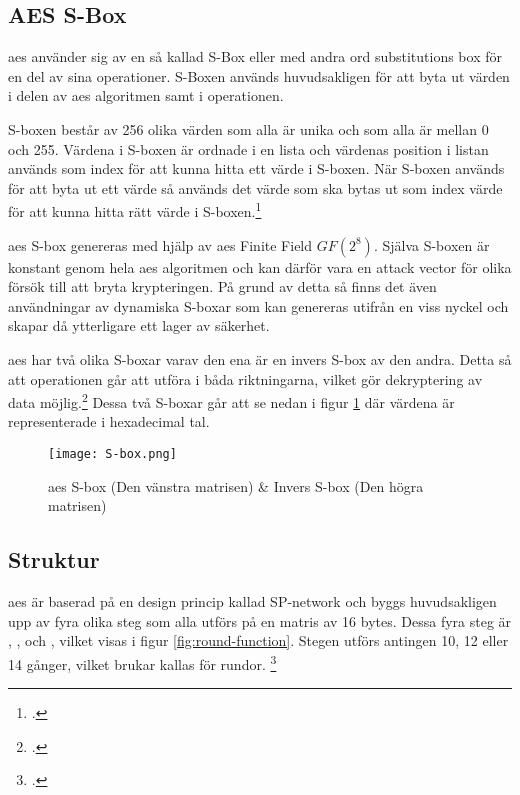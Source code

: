 \subsection{AES S-Box}
\label{sec:aes-sbox}
\acrshort{aes} använder sig av en så kallad S-Box eller med andra ord substitutions box
för en del av sina operationer. S-Boxen används huvudsakligen för att byta ut värden
i  delen av \acrshort{aes} algoritmen samt i
 operationen.

S-boxen består av 256 olika värden som alla är unika och som alla är mellan 0 och 255.
Värdena i S-boxen är ordnade i en lista och värdenas position i listan används som
index för att kunna hitta ett värde i S-boxen. När S-boxen används för att byta ut
ett värde så används det värde som ska bytas ut som index värde för att kunna hitta
rätt värde i S-boxen.\footcite{sbox_wiki}

\acrshort{aes} S-box genereras med hjälp av \acrshort{aes} Finite Field {$GF(2^8)$}.
Själva S-boxen är konstant genom hela \acrshort{aes} algoritmen och kan därför
vara en attack vector för olika försök till att bryta krypteringen. På grund av
detta så finns det även användningar av dynamiska S-boxar som kan genereras
utifrån en viss nyckel och skapar då ytterligare ett lager av säkerhet.

\acrshort{aes} har två olika S-boxar varav den ena är en invers S-box av den andra.
Detta så att operationen går att utföra i båda riktningarna, vilket gör dekryptering
av data möjlig.\footcite{sbox_wiki} Dessa två S-boxar går att se nedan i figur \ref{fig:aes-sbox} där
värdena är representerade i \gls{hexadecimal} tal.

\begin{figure}[H]
    \texttt{[image: S-box.png]}
    \caption{\acrshort{aes} S-box (Den vänstra matrisen) \& Invers S-box (Den högra matrisen)}
    \label{fig:aes-sbox}
\end{figure}

\subsection{Struktur}
\label{sec:aes-structure}
\acrshort{aes} är baserad på en design princip kallad \gls{SP-network} och byggs huvudsakligen upp av fyra olika steg som alla utförs på en matris av 16 \glspl{byte}. Dessa fyra steg är
, ,  och
, vilket visas i figur \ref{fig:round-function}. Stegen utförs antingen 10, 12 eller 14 gånger, vilket brukar kallas för rundor.
\footcite{daemen1999aes}

